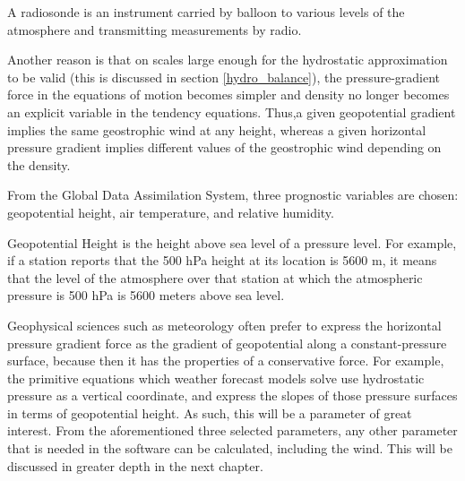 \begin{definition}
A radiosonde is an instrument carried by balloon to various levels of the atmosphere and transmitting measurements by radio.
\end{definition}

Another reason is that on scales large enough for the hydrostatic approximation to be valid (this is discussed in section \ref{hydro_balance}), the pressure-gradient force in the equations of motion becomes simpler and density no longer becomes an explicit variable in the tendency equations\cite{isobar_i}. Thus,a given geopotential gradient implies the same geostrophic wind at any height, whereas a given horizontal pressure gradient implies different values of the geostrophic wind depending on the density\cite{isobar_ii}.

From the Global Data Assimilation System, three prognostic variables are chosen: geopotential height, air temperature, and relative humidity.

\begin{definition}
Geopotential Height is the height above sea level of a pressure level. For example, if a station reports that the 500 hPa height at its location is 5600 m, it means that the level of the atmosphere over that station at which the atmospheric pressure is 500 hPa is 5600 meters above sea level.
\end{definition}

Geophysical sciences such as meteorology often prefer to express the horizontal pressure gradient force as the gradient of geopotential along a constant-pressure surface, because then it has the properties of a conservative force. For example, the primitive equations which weather forecast models solve use hydrostatic pressure as a vertical coordinate, and express the slopes of those pressure surfaces in terms of geopotential height. As such, this will be a parameter of great interest. From the aforementioned three selected parameters, any other parameter that is needed in the software can be calculated, including the wind. This will be discussed in greater depth in the next chapter.  
